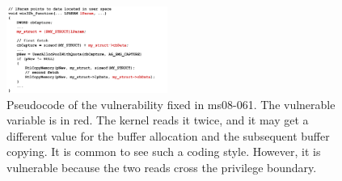 


%
%


\begin{figure}[th]
	\includegraphics[width=0.47\textwidth]{figures/code08061}
	\centering
	\caption{Pseudocode of the vulnerability fixed in ms08-061. The vulnerable variable is in red. The kernel reads it twice, and it may get a different value for the buffer allocation and the subsequent buffer copying. It is common to see such a coding style. However, it is vulnerable because the two reads cross the privilege boundary.}
	\label{fig:code08061}
\end{figure}



